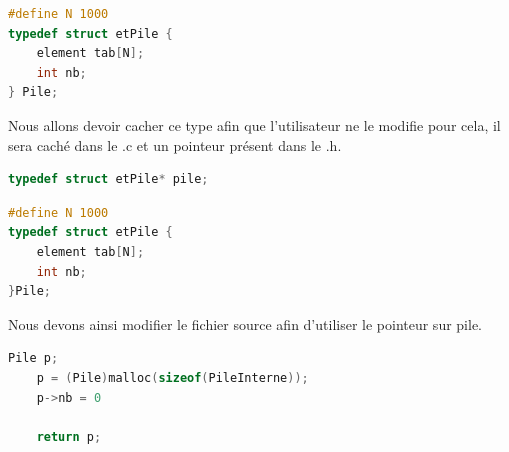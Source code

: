 \begin{lstlisting}[language=C, numbers=none,caption=Type de la pile statique originel -- Présent dans le .h]
#define N 1000
typedef struct etPile {
	element tab[N];
	int nb;
} Pile;
\end{lstlisting}

Nous allons devoir cacher ce type afin que l'utilisateur ne le modifie pour cela, il sera caché dans le .c et un pointeur présent dans le .h.
\begin{lstlisting}[language=C, numbers=none,frame=none, caption=Type de la pile statique -- Présent dans le .h]
typedef struct etPile* pile;
\end{lstlisting}
\begin{lstlisting}[language=C, numbers=none,caption=Type de la pile statique -- Présent dans le .c]
#define N 1000
typedef struct etPile {
	element tab[N];
	int nb;
}Pile;
\end{lstlisting}

Nous devons ainsi modifier le fichier source afin d'utiliser le pointeur sur pile.
\begin{lstlisting}[language=C, numbers=none,caption=Modification de la fonction \texttt{creer} s'adaptant à la protection de données]
	Pile p;
	p = (Pile)malloc(sizeof(PileInterne));
	p->nb = 0

	return p;
\end{lstlisting}

